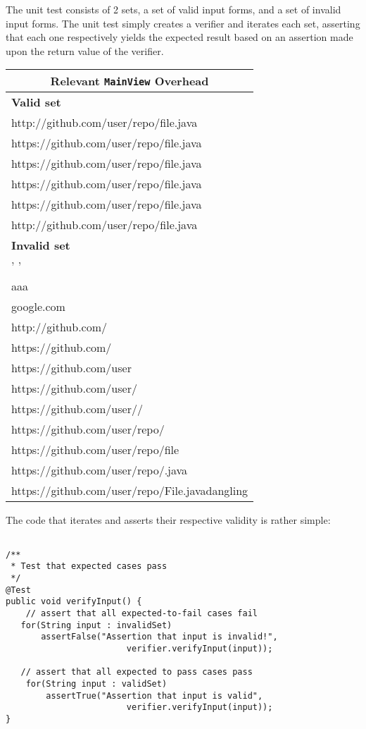 \documentclass[9pt]{article}
\renewenvironment{framed}[1][\hsize]
   {\MakeFramed{\hsize#1\advance\hsize-\width \FrameRestore}}%
   {\endMakeFramed}
\begin{document}
			The unit test consists of 2 sets, a set of valid input forms, and a
			set of invalid input forms. The unit test simply creates a verifier
			and iterates each set, asserting that each one respectively yields
			the expected result based on an assertion made upon the return value
			of the verifier.\\
			\begin{center}
				\begin{tabular}{ |p{13cm}|  }
					\hline
					\multicolumn{2}{|c|}{Relevant \texttt{MainView} Overhead} \\
					\hline
						\textbf{Valid set}\\
					\hline
http://github.com/user/repo/file.java\\
https://github.com/user/repo/file.java\\
\textvisiblespace https://github.com/user/repo/file.java\\
https://github.com/user/repo/file.java\textvisiblespace \\
\textvisiblespace https://github.com/user/repo/file.java\textvisiblespace\\
http://github.com/user/repo/file.java\\
					\hline
						\textbf{Invalid set}\\
					\hline
' '\\
aaa\\
google.com\\
http://github.com/\\
https://github.com/\\
https://github.com/user\\
https://github.com/user/\\
https://github.com/user//\\
https://github.com/user/repo/\\
https://github.com/user/repo/file\\
https://github.com/user/repo/.java\\
https://github.com/user/repo/File.java\textvisiblespace dangling\\

					\hline
				\end{tabular}
			\end{center}

			The code that iterates and asserts their respective validity is
			rather simple:

			\begin{framed}[1.2\textwidth]	
				\begin{verbatim}

/**
 * Test that expected cases pass
 */
@Test
public void verifyInput() {
	// assert that all expected-to-fail cases fail
   for(String input : invalidSet)
	   assertFalse("Assertion that input is invalid!",
	   					verifier.verifyInput(input));

   // assert that all expected to pass cases pass
	for(String input : validSet)
		assertTrue("Assertion that input is valid",
						verifier.verifyInput(input));
}
			\end{verbatim}
		\end{framed}
\end{document}
